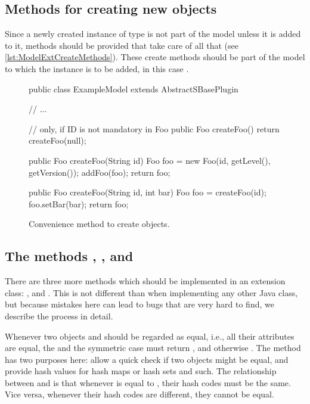 \subsection{Methods for creating new objects}

Since a newly created instance of type  is not part of the model
unless it is added to it,  methods should be provided that
take care of all that (see \vref{lst:ModelExtCreateMethods}).
These create methods should be part of the model to which the 
instance is to be added, in this case .

\begin{figure}[thb]
  \begin{example}[numbers=left]
public class ExampleModel extends AbstractSBasePlugin {

  // ...

  // only, if ID is not mandatory in Foo
  public Foo createFoo() {
    return createFoo(null);
  }

  public Foo createFoo(String id) {
    Foo foo = new Foo(id, getLevel(), getVersion());
    addFoo(foo);
    return foo;
  }

  public Foo createFoo(String id, int bar) {
    Foo foo = createFoo(id);
    foo.setBar(bar);
    return foo;
  }
}\end{example}
  \caption{Convenience method to create  objects.}
  \label{lst:ModelExtCreateMethods}
\end{figure}


\subsection{The methods , , and }

There are three more methods which should be implemented in an extension
class: ,  and .  This is not
different than when implementing any other Java class, but because mistakes
here can lead to bugs that are very hard to find, we describe the process in
detail.

Whenever two objects  and  should be regarded as equal,
i.e., all their attributes are equal, the  and the
symmetric case  must return , and otherwise
. The  method has two purposes here: allow a
quick check if two objects might be equal, and provide hash values for hash
maps or hash sets and such. The relationship between  and
 is that whenever  is equal to , their
hash codes must be the same. Vice versa, whenever their hash codes are
different, they cannot be equal.

